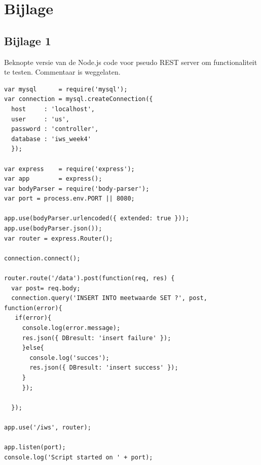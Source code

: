 \documentclass[12pt]{article}
\begin{document}
\section{Bijlage}
\subsection*{Bijlage 1}
Beknopte versie van de Node.js code voor pseudo REST server om functionaliteit te testen. Commentaar is weggelaten.
\begin{lstlisting}
var mysql      = require('mysql');
var connection = mysql.createConnection({
  host     : 'localhost',
  user     : 'us',
  password : 'controller',
  database : 'iws_week4'
  });

var express    = require('express');
var app        = express();  
var bodyParser = require('body-parser');
var port = process.env.PORT || 8080;

app.use(bodyParser.urlencoded({ extended: true }));
app.use(bodyParser.json()); 
var router = express.Router(); 

connection.connect();

router.route('/data').post(function(req, res) {
  var post= req.body;
  connection.query('INSERT INTO meetwaarde SET ?', post, function(error){
   if(error){
     console.log(error.message);
     res.json({ DBresult: 'insert failure' });
     }else{
       console.log('succes');
       res.json({ DBresult: 'insert success' });
     }
     });
  
  });

app.use('/iws', router);

app.listen(port);
console.log('Script started on ' + port);
\end{lstlisting}
\end{document}
